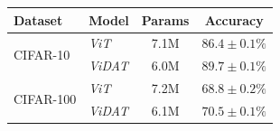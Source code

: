 
\begin{tabular}{l|l|c|c}
    \toprule
    Dataset & Model & Params & Accuracy \\
    \midrule
    \multirow{2}{*}{CIFAR-10} & \textit{ViT} & 7.1M & $86.4 \pm 0.1\%$ \\
              & \textit{ViDAT} & 6.0M & $\mathbf{89.7 \pm 0.1\%}$ \\
    \hline
    \multirow{2}{*}{CIFAR-100} & \textit{ViT} & 7.2M & $68.8 \pm 0.2\%$ \\
              & \textit{ViDAT} & 6.1M & $\mathbf{70.5 \pm 0.1\%}$ \\
    \bottomrule
\end{tabular}
